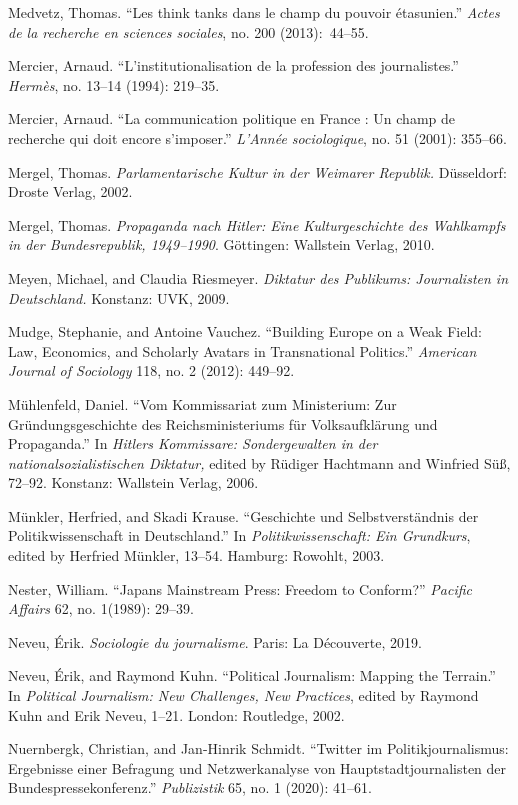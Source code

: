 \documentclass{tufte-handout}
\begin{document}
\begin{hangparas}{.25in}{1}
Medvetz, Thomas. ``Les think tanks dans le champ du pouvoir étasunien.''
\emph{Actes de la recherche en sciences sociales}, no. 200
(2013):~44--55.

Mercier, Arnaud. ``L'institutionalisation de la profession des
journalistes.'' \emph{Hermès}, no. 13--14 (1994): 219--35.

Mercier, Arnaud. ``La communication politique en France : Un champ de
recherche qui doit encore s'imposer.'' \emph{L'Année sociologique}, no.
51 (2001): 355--66.

Mergel, Thomas. \emph{Parlamentarische Kultur in der Weimarer Republik.}
Düsseldorf: Droste Verlag, 2002.

Mergel, Thomas. \emph{Propaganda nach Hitler: Eine Kulturgeschichte des
Wahlkampfs in der Bundesrepublik, 1949--1990}. Göttingen: Wallstein
Verlag, 2010.

Meyen, Michael, and Claudia Riesmeyer. \emph{Diktatur des Publikums:
Journalisten in Deutschland.} Konstanz: UVK, 2009.

Mudge, Stephanie, and Antoine Vauchez. ``Building Europe on a Weak
Field: Law, Economics, and Scholarly Avatars in Transnational
Politics.'' \emph{American Journal of Sociology} 118, no. 2 (2012):
449--92.

Mühlenfeld, Daniel. ``Vom Kommissariat zum Ministerium: Zur
Gründungsgeschichte des Reichsministeriums für Volksaufklärung und
Propaganda.'' In \emph{Hitlers Kommissare: Sondergewalten in der
nationalsozialistischen Diktatur,} edited by Rüdiger Hachtmann and
Winfried Süß, 72--92. Konstanz: Wallstein Verlag, 2006.

Münkler, Herfried, and Skadi Krause. ``Geschichte und Selbstverständnis
der Politikwissenschaft in Deutschland.'' In \emph{Politikwissenschaft:
Ein Grundkurs}, edited by Herfried Münkler, 13--54. Hamburg: Rowohlt,
2003.

Nester, William. ``Japan\textquotesingle s Mainstream Press: Freedom to
Conform?'' \emph{Pacific Affairs} 62, no. 1(1989): 29--39.

Neveu, Érik. \emph{Sociologie du journalisme}. Paris: La Découverte,
2019.

Neveu, Érik, and Raymond Kuhn. ``Political Journalism: Mapping the
Terrain.'' In \emph{Political Journalism: New Challenges, New
Practices}, edited by Raymond Kuhn and Erik Neveu, 1--21. London:
Routledge, 2002.

Nuernbergk, Christian, and Jan-Hinrik Schmidt. ``Twitter im
Politikjournalismus: Ergebnisse einer Befragung und Netzwerkanalyse von
Hauptstadtjournalisten der Bundespressekonferenz.'' \emph{Publizistik}
65, no. 1 (2020): 41--61.


\end{hangparas}
\end{document}
